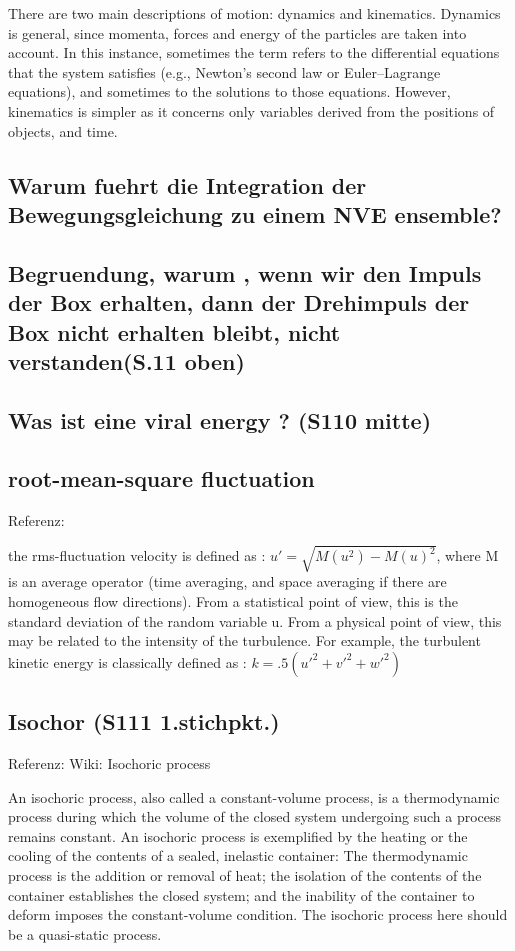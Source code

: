 \documentclass[]{article}
\begin{document}
There are two main descriptions of motion: dynamics and kinematics. Dynamics is general, since momenta, forces and energy of the particles are taken into account. In this instance, sometimes the term refers to the differential equations that the system satisfies (e.g., Newton's second law or Euler–Lagrange equations), and sometimes to the solutions to those equations.
However, kinematics is simpler as it concerns only variables derived from the positions of objects, and time. 

\subsection{Warum fuehrt die Integration der Bewegungsgleichung zu einem NVE ensemble?}

\subsection{Begruendung, warum , wenn wir den Impuls der Box erhalten, dann der Drehimpuls der Box nicht erhalten bleibt, nicht verstanden(S.11 oben)}

\subsection{Was ist eine \glqq viral energy \grqq? (S110 mitte)}

\subsection{root-mean-square fluctuation}
Referenz: %

the \glqq rms-fluctuation velocity \grqq is defined as : $u'=\sqrt{ M(u^2) - {M(u)}^2 }$, where M is an average operator (time averaging, and space averaging if there are homogeneous flow directions). From a statistical point of view, this is the standard deviation of the random variable u. From a physical point of view, this may be related to the intensity of the turbulence. For example, the turbulent kinetic energy is classically defined as : $k=.5(u'^2+v'^2+w'^2)$

\subsection{Isochor (S111 1.stichpkt.)}
Referenz: Wiki: Isochoric process

An isochoric process, also called a constant-volume process, is a thermodynamic process during which the volume of the closed system undergoing such a process remains constant. An isochoric process is exemplified by the heating or the cooling of the contents of a sealed, inelastic container: The thermodynamic process is the addition or removal of heat; the isolation of the contents of the container establishes the closed system; and the inability of the container to deform imposes the constant-volume condition. The isochoric process here should be a quasi-static process.
\end{document}
